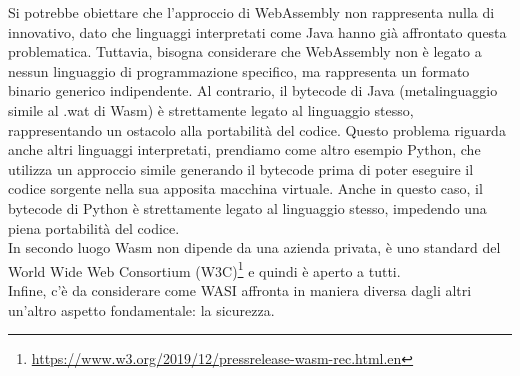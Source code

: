 Si potrebbe obiettare che l'approccio di WebAssembly non rappresenta nulla di innovativo, dato che linguaggi
interpretati come Java hanno già affrontato questa problematica. Tuttavia, bisogna considerare che WebAssembly non è
legato a nessun linguaggio di programmazione specifico, ma rappresenta un formato binario generico indipendente. Al
contrario, il bytecode di Java (metalinguaggio simile al .wat di Wasm) è strettamente legato al linguaggio stesso,
rappresentando un ostacolo alla portabilità del codice. Questo problema riguarda anche altri linguaggi interpretati,
prendiamo come altro esempio Python, che utilizza un approccio simile generando il bytecode prima di poter eseguire il
codice sorgente nella sua apposita macchina virtuale. Anche in questo caso, il bytecode di Python è strettamente legato
al linguaggio stesso, impedendo una piena portabilità del codice. \\In secondo luogo Wasm non dipende da una azienda
privata, è uno standard del World Wide Web Consortium
(W3C)\footnote{\url{https://www.w3.org/2019/12/pressrelease-wasm-rec.html.en}} e quindi è aperto a tutti. \\Infine, c'è
da considerare come WASI affronta in maniera diversa dagli altri un'altro aspetto fondamentale: la sicurezza.

